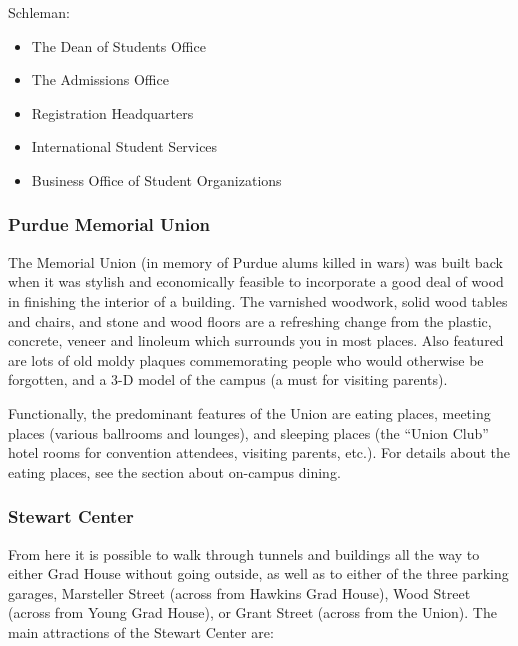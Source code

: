 Schleman:
\begin{itemize}
	\item The Dean of Students Office
	\item The Admissions Office
	\item Registration Headquarters
	\item International Student Services
	\item Business Office of Student Organizations
\end{itemize}



\subsubsection{Purdue Memorial Union}
The Memorial Union (in memory of Purdue alums killed in wars) was built back when it was stylish and economically feasible to incorporate a good deal of wood in finishing the interior of a building. The varnished woodwork, solid wood tables and chairs, and stone and wood floors are a refreshing change from the plastic, concrete, veneer and linoleum which surrounds you in most places. Also featured are lots of old moldy plaques commemorating people who would otherwise be forgotten, and a 3-D model of the campus (a must for visiting parents).

Functionally, the predominant features of the Union are eating places, meeting places (various ballrooms and lounges), and sleeping places (the “Union Club” hotel rooms for convention attendees, visiting parents, etc.). For details about the eating places, see the section about on-campus dining.



\subsubsection{Stewart Center}
From here it is possible to walk through tunnels and buildings all the way to either Grad House without going outside, as well as to either of the three parking garages, Marsteller Street (across from Hawkins Grad House), Wood Street (across from Young Grad House), or Grant Street (across from the Union). The main attractions of the Stewart Center are:

